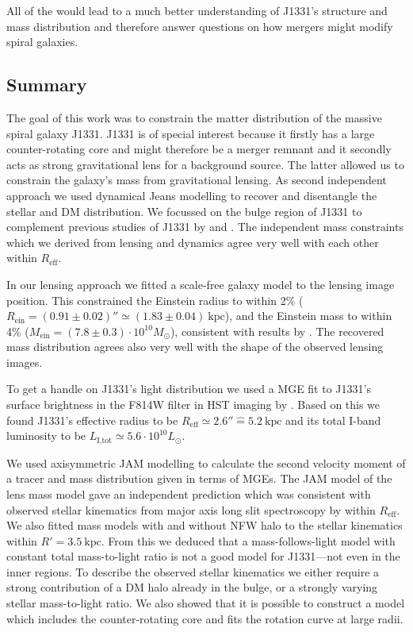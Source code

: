 \documentclass[useAMS,usenatbib]{mnras}
\begin{document}
All of the would lead to a much better understanding of J1331's structure and mass distribution and therefore answer questions on how mergers might modify spiral galaxies.

\subsection{Summary}

The goal of this work was to constrain the matter distribution of the massive spiral galaxy J1331. J1331 is of special interest because it firstly has a large counter-rotating core and might therefore be a merger remnant and it secondly acts as strong gravitational lens for a background source. The latter allowed us to constrain the galaxy's mass from gravitational lensing. As second independent approach we used dynamical Jeans modelling to recover and disentangle the stellar and DM distribution. We focussed on the bulge region of J1331 to complement previous studies of J1331 by \citet{SWELLSIII} and \citet{SWELLSV}. The independent mass constraints which we derived from lensing and dynamics agree very well with each other within $R_\text{eff}$.

In our lensing approach we fitted a scale-free galaxy model to the lensing image position. This constrained the Einstein radius to within 2\% ($R_\text{ein}=(0.91\pm0.02)''\simeq(1.83\pm0.04)~\text{kpc}$), and the Einstein mass to within 4\% ($M_\text{ein} = (7.8\pm0.3) \cdot 10^{10} M_\odot$), consistent with results by \citet{SWELLSIII}. The recovered mass distribution agrees also very well with the shape of the observed lensing images.

To get a handle on J1331's light distribution we used a MGE fit to J1331's surface brightness in the F814W filter in HST imaging by \citet{SWELLSI}. Based on this we found J1331's effective radius to be $R_\text{eff} \simeq 2.6'' \hat{=} 5.2~\text{kpc}$ and its total I-band luminosity to be $L_\text{I,tot} \simeq 5.6 \cdot 10^{10} L_\odot$.

We used axisymmetric JAM modelling to calculate the second velocity moment of a tracer and mass distribution given in terms of MGEs. The JAM model of the lens mass model gave an independent prediction which was consistent with observed stellar kinematics from major axis long slit spectroscopy by \citet{SWELLSV} within $R_\text{eff}$. We also fitted mass models with and without NFW halo to the stellar kinematics within $R'=3.5~\text{kpc}$. From this we deduced that a mass-follows-light model with constant total mass-to-light ratio is not a good model for J1331---not even in the inner regions. To describe the observed stellar kinematics we either require a strong contribution of a DM halo already in the bulge, or a strongly varying stellar mass-to-light ratio. We also showed that it is possible to construct a model which includes the counter-rotating core and fits the rotation curve at large radii.
\end{document}
